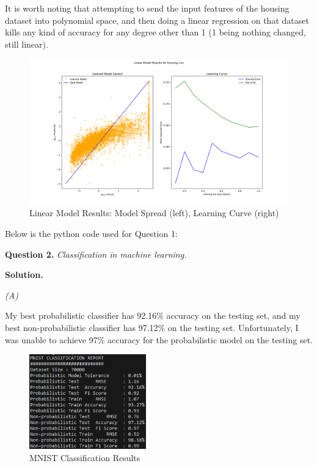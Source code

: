 \documentclass[10pt]{article}
\begin{document}
It is worth noting that attempting to send the input features of the housing dataset into polynomial space, and then doing a linear regression on that dataset kills any kind of accuracy for any degree other than 1 (1 being nothing changed, still linear).

\begin{figure}[h]
    \includegraphics[width=\textwidth]{../plots/q1/linear_model_results.png}
    \centering
    \caption{Linear Model Results: Model Spread (left), Learning Curve (right)}
    \label{fig:q1_results}
\end{figure}

\bigskip
Below is the python code used for Question 1:


\clearpage

\textbf{Question 2.} \textit{Classification in machine learning.}

\textbf{Solution.}

\smallskip
\textit{(A)}

\smallskip
My best probabilistic classifier has 92.16\% accuracy on the testing set, and my best non-probabilistic classifier has 97.12\% on the testing set. Unfortunately, I was unable to achieve 97\% accuracy for the probabilistic model on the testing set.

\begin{figure}[h]
    \includegraphics[width=0.45\textwidth]{../logs/mnist.png}
    \centering
    \caption{MNIST Classification Results}
    \label{fig:q2_results}
\end{figure}
\end{document}
